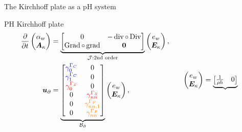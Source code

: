 \documentclass[aspectratio=169]{ISAE-Beamer}
\DeclareMathOperator*{\grad}{grad}
\DeclareMathOperator*{\Grad}{Grad}
\DeclareMathOperator*{\Div}{Div}
\renewcommand{\div}{\operatorname{div}}
\begin{document}
\begin{frame}{The Kirchhoff plate as a pH system}
	\begin{block}{PH Kirchhoff plate}
		\begin{equation*}
		\begin{aligned}
		\displaystyle
		\diffp{}{t}
		\begin{pmatrix}
		\alpha_w \\
		\bm{A}_{\kappa} \\
		\end{pmatrix} &= 
		\underbrace{\begin{bmatrix}
			0  &  - \div \circ \Div \\
			\Grad \circ \grad & \bm{0} \\
			\end{bmatrix}}_{\mathcal{J}: \text{2nd order}}
		\begin{pmatrix}
		e_w \\
		\bm{E}_{\kappa} \\
		\end{pmatrix}, \vspace{3pt}\\
		\bm{u}_\partial &= \underbrace{
			\begin{bmatrix}
			\textcolor{blue}{\gamma_{0}^{\Gamma_C}} & {0}  \\
			\textcolor{blue}{\gamma_1^{\Gamma_C}} &  {0} \\
			\textcolor{red}{\gamma_{0}^{\Gamma_S}} &  {0}  \\
			{0} & \textcolor{red}{\gamma_{nn}^{\Gamma_S}} \\
			{0} & \textcolor{orange}{\gamma_{nn, 1}^{\Gamma_F}}  \\
			{0} & \textcolor{orange}{\gamma_{nn}^{\Gamma_F}}\\
			\end{bmatrix}}_{\mathcal{B}_\partial} \begin{pmatrix}
		e_w \\
		\bm{E}_{\kappa} \\
		\end{pmatrix}, 
		\end{aligned} \qquad
		\begin{aligned}
		\begin{pmatrix}
		e_w \\
		\bm{E}_{\kappa} \\
		\end{pmatrix} &= 
		\underbrace{\begin{bmatrix}
		\frac{1}{\rho h}  &  0 \\

\end{bmatrix}}
\end{aligned}
\end{equation*}
\end{block}
\end{frame}
\end{document}
